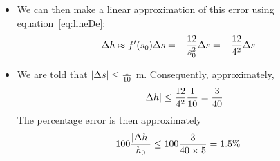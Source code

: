\begin{eg}
\begin{itemize}
\item We can then make a linear approximation of this error using
equation~\eqref{eq:lineDe}:
\begin{align*}
\Delta h &\approx f'(s_0)\Delta s =-\frac{12}{s_0^2}\Delta s =-\frac{12}{4^2}\Delta s
\end{align*}
\item We are told that $|\Delta s|\le\frac{1}{10}$ m. Consequently, approximately,
\begin{align*}
 |\Delta h|\le \frac{12}{4^2}\frac{1}{10}=\frac{3}{40}
\end{align*}
The percentage error is then approximately
\begin{align*}
  100\frac{|\Delta h|}{h_0} & \le 100\frac{3}{40\times 5}=1.5\%
\end{align*}
\end{itemize}
\end{eg}

%
%

